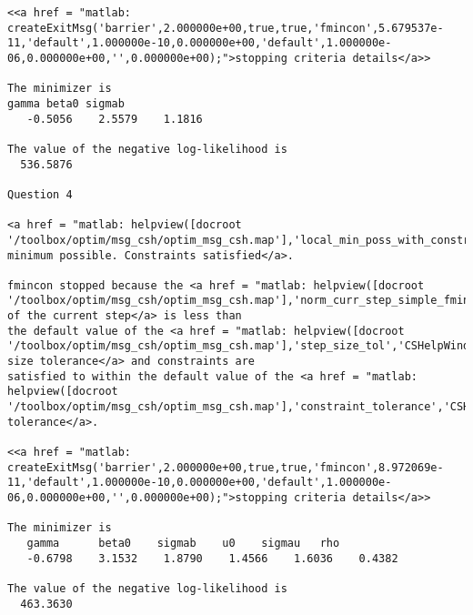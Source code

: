 \documentclass[12pt]{article}
\begin{document}
\begin{small}
\begin{verbatim}
<<a href = "matlab: createExitMsg('barrier',2.000000e+00,true,true,'fmincon',5.679537e-11,'default',1.000000e-10,0.000000e+00,'default',1.000000e-06,0.000000e+00,'',0.000000e+00);">stopping criteria details</a>>

The minimizer is
gamma beta0 sigmab
   -0.5056    2.5579    1.1816

The value of the negative log-likelihood is
  536.5876

Question 4

<a href = "matlab: helpview([docroot '/toolbox/optim/msg_csh/optim_msg_csh.map'],'local_min_poss_with_constr','CSHelpWindow');">Local minimum possible. Constraints satisfied</a>.

fmincon stopped because the <a href = "matlab: helpview([docroot '/toolbox/optim/msg_csh/optim_msg_csh.map'],'norm_curr_step_simple_fminconip','CSHelpWindow');">size of the current step</a> is less than
the default value of the <a href = "matlab: helpview([docroot '/toolbox/optim/msg_csh/optim_msg_csh.map'],'step_size_tol','CSHelpWindow');">step size tolerance</a> and constraints are 
satisfied to within the default value of the <a href = "matlab: helpview([docroot '/toolbox/optim/msg_csh/optim_msg_csh.map'],'constraint_tolerance','CSHelpWindow');">constraint tolerance</a>.

<<a href = "matlab: createExitMsg('barrier',2.000000e+00,true,true,'fmincon',8.972069e-11,'default',1.000000e-10,0.000000e+00,'default',1.000000e-06,0.000000e+00,'',0.000000e+00);">stopping criteria details</a>>

The minimizer is
   gamma      beta0    sigmab    u0    sigmau   rho
   -0.6798    3.1532    1.8790    1.4566    1.6036    0.4382

The value of the negative log-likelihood is
  463.3630


\end{verbatim}
\end{small}
\end{document}
